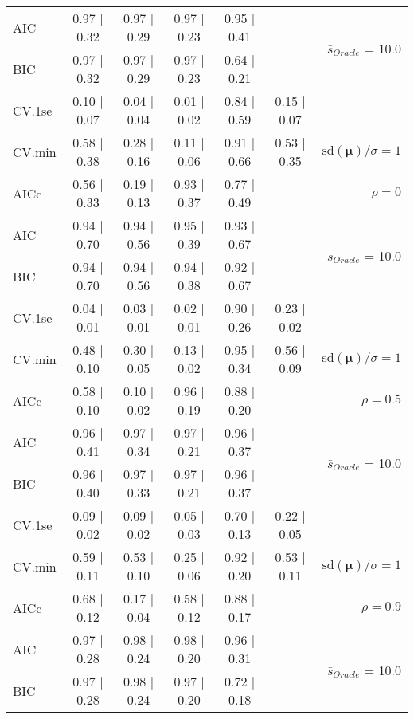 \begin{table}
\begin{center}
\begin{tabular}{l*{5}{c}|r}
AIC & 0.97 $\mid$ 0.32 & 0.97 $\mid$ 0.29 & 0.97 $\mid$ 0.23 & 0.95 $\mid$ 0.41 & &  \multirow{2}{*}{$\bar{s}_{Oracle}$ = 10.0} \\
BIC & 0.97 $\mid$ 0.32 & 0.97 $\mid$ 0.29 & 0.97 $\mid$ 0.23 & 0.64 $\mid$ 0.21 & &  \\
 \hline 
CV.1se & 0.10 $\mid$ 0.07 & 0.04 $\mid$ 0.04 & 0.01 $\mid$ 0.02 & 0.84 $\mid$ 0.59 & 0.15 $\mid$ 0.07 & \\
CV.min & 0.58 $\mid$ 0.38 & 0.28 $\mid$ 0.16 & 0.11 $\mid$ 0.06 & 0.91 $\mid$ 0.66 & 0.53 $\mid$ 0.35 &  $\mathrm{sd}(\mathbf{\mu})/\sigma=1$ \\
AICc & 0.56 $\mid$ 0.33 & 0.19 $\mid$ 0.13 & 0.93 $\mid$ 0.37 & 0.77 $\mid$ 0.49 & & $\rho=0$ \\
AIC & 0.94 $\mid$ 0.70 & 0.94 $\mid$ 0.56 & 0.95 $\mid$ 0.39 & 0.93 $\mid$ 0.67 & &  \multirow{2}{*}{$\bar{s}_{Oracle}$ = 10.0} \\
BIC & 0.94 $\mid$ 0.70 & 0.94 $\mid$ 0.56 & 0.94 $\mid$ 0.38 & 0.92 $\mid$ 0.67 & &  \\
 \hline 
CV.1se & 0.04 $\mid$ 0.01 & 0.03 $\mid$ 0.01 & 0.02 $\mid$ 0.01 & 0.90 $\mid$ 0.26 & 0.23 $\mid$ 0.02 & \\
CV.min & 0.48 $\mid$ 0.10 & 0.30 $\mid$ 0.05 & 0.13 $\mid$ 0.02 & 0.95 $\mid$ 0.34 & 0.56 $\mid$ 0.09 &  $\mathrm{sd}(\mathbf{\mu})/\sigma=1$ \\
AICc & 0.58 $\mid$ 0.10 & 0.10 $\mid$ 0.02 & 0.96 $\mid$ 0.19 & 0.88 $\mid$ 0.20 & & $\rho=0.5$ \\
AIC & 0.96 $\mid$ 0.41 & 0.97 $\mid$ 0.34 & 0.97 $\mid$ 0.21 & 0.96 $\mid$ 0.37 & &  \multirow{2}{*}{$\bar{s}_{Oracle}$ = 10.0} \\
BIC & 0.96 $\mid$ 0.40 & 0.97 $\mid$ 0.33 & 0.97 $\mid$ 0.21 & 0.96 $\mid$ 0.37 & &  \\
 \hline 
CV.1se & 0.09 $\mid$ 0.02 & 0.09 $\mid$ 0.02 & 0.05 $\mid$ 0.03 & 0.70 $\mid$ 0.13 & 0.22 $\mid$ 0.05 & \\
CV.min & 0.59 $\mid$ 0.11 & 0.53 $\mid$ 0.10 & 0.25 $\mid$ 0.06 & 0.92 $\mid$ 0.20 & 0.53 $\mid$ 0.11 &  $\mathrm{sd}(\mathbf{\mu})/\sigma=1$ \\
AICc & 0.68 $\mid$ 0.12 & 0.17 $\mid$ 0.04 & 0.58 $\mid$ 0.12 & 0.88 $\mid$ 0.17 & & $\rho=0.9$ \\
AIC & 0.97 $\mid$ 0.28 & 0.98 $\mid$ 0.24 & 0.98 $\mid$ 0.20 & 0.96 $\mid$ 0.31 & &  \multirow{2}{*}{$\bar{s}_{Oracle}$ = 10.0} \\
BIC & 0.97 $\mid$ 0.28 & 0.98 $\mid$ 0.24 & 0.97 $\mid$ 0.20 & 0.72 $\mid$ 0.18 & &  \\

\end{tabular}
\end{center}
\end{table}
